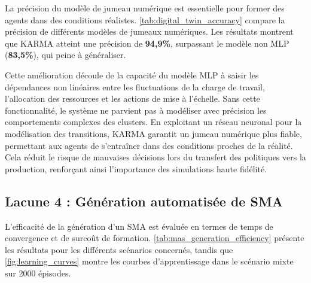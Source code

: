 \begin{table}[h]
  \centering
  \caption{Précision des modèles de transition dans tous les scénarios.}
  \label{tab:digital_twin_accuracy}
\end{table}
%
La précision du modèle de jumeau numérique est essentielle pour former des agents dans des conditions réalistes.
\autoref{tab:digital_twin_accuracy} compare la précision de différents modèles de jumeaux numériques. Les résultats montrent que KARMA atteint une précision de \textbf{94,9\%}, surpassant le modèle non MLP (\textbf{83,5\%}), qui peine à généraliser.

Cette amélioration découle de la capacité du modèle MLP à saisir les dépendances non linéaires entre les fluctuations de la charge de travail, l'allocation des ressources et les actions de mise à l'échelle. Sans cette fonctionnalité, le système ne parvient pas à modéliser avec précision les comportements complexes des clusters.
%
En exploitant un réseau neuronal pour la modélisation des transitions, KARMA garantit un jumeau numérique plus fiable, permettant aux agents de s'entraîner dans des conditions proches de la réalité. Cela réduit le risque de mauvaises décisions lors du transfert des politiques vers la production, renforçant ainsi l'importance des simulations haute fidélité.



\subsection{Lacune 4 : Génération automatisée de SMA}

L'efficacité de la génération d'un SMA est évaluée en termes de temps de convergence et de surcoût de formation. \autoref{tab:mas_generation_efficiency} présente les résultats pour les différents scénarios concernés, tandis que \autoref{fig:learning_curves} montre les courbes d'apprentissage dans le scénario mixte sur 2000 épisodes.

